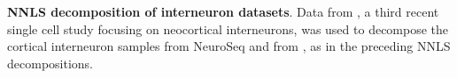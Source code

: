 \textbf{NNLS decomposition of interneuron datasets}. Data from \citep{Paul_2017}, a third recent single cell study focusing on neocortical interneurons, was used to decompose the cortical interneuron samples from NeuroSeq and from \citep{Tasic_2018,Zeisel_2018}, as in the preceding NNLS decompositions.